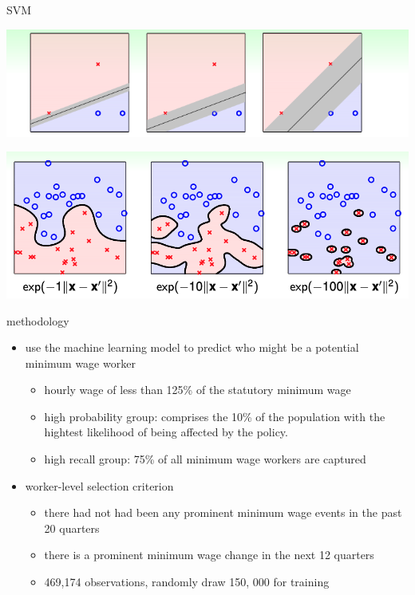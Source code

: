 \documentclass[
  ignorenonframetext,
]{beamer}
\begin{document}
\begin{frame}{SVM}
  \begin{center}
    \includegraphics{figure/pdf/svm1.png}
  \end{center}
  \begin{center}
    \includegraphics{figure/pdf/svm2.png}
  \end{center}
\end{frame}

\begin{frame}{methodology}
\begin{itemize}
  \item use the machine learning model to predict who might be a potential minimum wage worker
  \begin{itemize}
    \item hourly wage of less than 125\% of the statutory minimum wage
    \item high probability group: comprises the 10\% of the population with the hightest 
          likelihood of being affected by the policy.
    \item high recall group: 75\% of all minimum wage workers are captured
  \end{itemize}
  \item worker-level selection criterion
  \begin{itemize}
    \item there had not had been any prominent minimum wage events in the past 20 quarters
    \item there is a prominent minimum wage change in the next 12 quarters
    \item 469,174 observations, randomly draw 150, 000 for training
  \end{itemize}
\end{itemize}
\end{frame}
\end{document}

